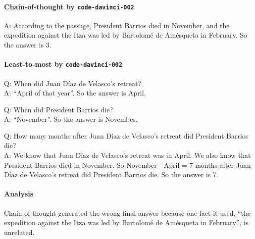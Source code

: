 \paragraph{Chain-of-thought by \texttt{code-davinci-002}}
A: According to the passage, President Barrios died in November, and the expedition against the Itza was led by Bartolomé de Amésqueta in February. So the answer is 3.

\paragraph{Least-to-most by \texttt{code-davinci-002}}
Q: When did Juan Díaz de Velasco's retreat?\\
A: ``April of that year''. So the answer is April.

Q: When did President Barrios die?\\
A: ``November''. So the answer is November.

Q: How many months after Juan Díaz de Velasco's retreat did President Barrios die?\\
A: We know that Juan Díaz de Velasco's retreat was in April. We also know that President Barrios died in November. So November - April = 7 months after Juan Díaz de Velasco's retreat did President Barrios die. So the answer is 7.

\paragraph{Analysis}
Chain-of-thought generated the wrong final answer because one fact it used, ``the expedition against the Itza was led by Bartolomé de Amésqueta in February'', is unrelated.

